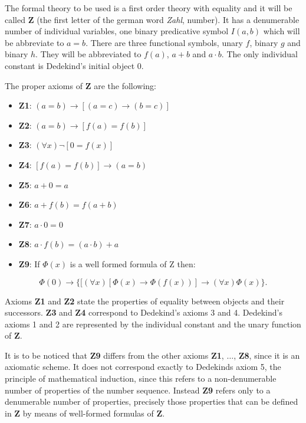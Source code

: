 \documentclass[12pt]{article}
\begin{document}
The formal theory to be used is a first order theory with equality and it will be called $\textbf{Z}$ (the first letter of the german word \emph{Zahl}, number). It has a denumerable number of individual variables, one binary predicative symbol $I (a, b)$ which will be abbreviate to $a = b$. There are three functional symbols, unary $f$, binary $g$ and binary $h$. They will be abbreviated to $f (a)$, $a + b$ and $a \cdot b$. The only individual constant is Dedekind's initial object 0.

The proper axioms of $\textbf{Z}$ are the following:

\begin{itemize}
\item \textbf{Z1}: $(a = b) \rightarrow [ (a = c) \rightarrow (b = c) ]$
\item \textbf{Z2}: $(a = b) \rightarrow [ f (a) = f (b) ]$
\item \textbf{Z3}: $(\forall x) \neg [ 0 = f (x) ]$
\item \textbf{Z4}: $[ f (a) = f (b) ] \rightarrow (a = b)$
\item \textbf{Z5}: $a + 0 = a$ 
\item \textbf{Z6}: $a  + f (b) = f (a + b)$
\item \textbf{Z7}: $a \cdot 0 = 0$ 
\item \textbf{Z8}: $a \cdot f (b) = (a \cdot b) + a$ 
\item \textbf{Z9}: If $\Phi (x)$ is a  well formed formula of Z then:
\end{itemize}
 
$$\Phi (0) \rightarrow \{ [ (\forall x) [ \Phi(x) \rightarrow \Phi ( f (x)) ] \rightarrow (\forall x) \Phi (x) \}.$$   

Axioms \textbf{Z1} and \textbf{Z2} state the properties of equality between objects and their successors. \textbf{Z3} and \textbf{Z4} correspond to Dedekind's axioms 3 and 4. Dedekind's axioms 1 and 2 are represented by the individual constant and the unary function of $\textbf{Z}$. 

It is to be noticed that \textbf{Z9} differs from the other axioms \textbf{Z1}, $\ldots$, \textbf{Z8}, since it is an axiomatic scheme. It does not correspond exactly to Dedekinds axiom 5, the principle of mathematical induction, since this refers to a non-denumerable number of properties of the number sequence. Instead \textbf{Z9} refers only to a denumerable number of properties, precisely those properties that can be defined in $\textbf{Z}$ by means of well-formed formulas of $\textbf{Z}$.
\end{document}
